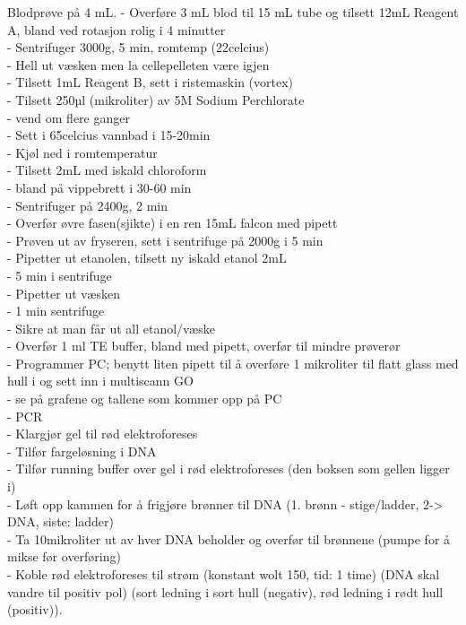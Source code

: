 \documentclass[
]{book}
\begin{document}
Blodprøve på 4 mL. - Overføre 3 mL blod til 15 mL tube og tilsett 12mL Reagent A, bland ved rotasjon rolig i 4 minutter\\
- Sentrifuger 3000g, 5 min, romtemp (22celcius)\\
- Hell ut væsken men la cellepelleten være igjen\\
- Tilsett 1mL Reagent B, sett i ristemaskin (vortex)\\
- Tilsett 250µl (mikroliter) av 5M Sodium Perchlorate\\
- vend om flere ganger\\
- Sett i 65celcius vannbad i 15-20min\\
- Kjøl ned i romtemperatur\\
- Tilsett 2mL med iskald chloroform\\
- bland på vippebrett i 30-60 min\\
- Sentrifuger på 2400g, 2 min\\
- Overfør øvre fasen(sjikte) i en ren 15mL falcon med pipett\\
- Prøven ut av fryseren, sett i sentrifuge på 2000g i 5 min\\
- Pipetter ut etanolen, tilsett ny iskald etanol 2mL\\
- 5 min i sentrifuge\\
- Pipetter ut væsken\\
- 1 min sentrifuge\\
- Sikre at man får ut all etanol/væske\\
- Overfør 1 ml TE buffer, bland med pipett, overfør til mindre prøverør\\
- Programmer PC; benytt liten pipett til å overføre 1 mikroliter til flatt glass med hull i og sett inn i multiscann GO\\
- se på grafene og tallene som kommer opp på PC\\
- PCR\\
- Klargjør gel til rød elektroforeses\\
- Tilfør fargeløsning i DNA\\
- Tilfør running buffer over gel i rød elektroforeses (den boksen som gellen ligger i)\\
- Løft opp kammen for å frigjøre brønner til DNA (1. brønn - stige/ladder, 2-\textgreater{} DNA, siste: ladder)\\
- Ta 10mikroliter ut av hver DNA beholder og overfør til brønnene (pumpe for å mikse før overføring)\\
- Koble rød elektroforeses til strøm (konstant wolt 150, tid: 1 time) (DNA skal vandre til positiv pol) (sort ledning i sort hull (negativ), rød ledning i rødt hull (positiv)). \citet{bartlett2003}
\end{document}
